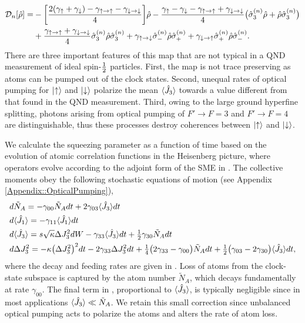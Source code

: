 \documentclass[aps,pra,twocolumn]{revtex4-1} %
\newcommand{\half}{\smallfrac{1}{2}}
\newcommand{\varz}{\Delta J_3^2}
\newcommand{\jz}{\hat{J}_3}
\newcommand{\NA}{\tilde{N}_A}
\newcommand{\gammauu}{\gamma_{\uparrow \rightarrow \uparrow}}
\newcommand{\gammadd}{\gamma_{\downarrow \rightarrow \downarrow}}
\newcommand{\gammaud}{\gamma_{\uparrow \rightarrow \downarrow}}
\newcommand{\gammadu}{\gamma_{\downarrow \rightarrow \uparrow}}
\newcommand{\gammau}{\gamma_{\uparrow}}
\newcommand{\gammad}{\gamma_{\downarrow}}
\begin{document}
	\begin{align} \label{Eq::OpticalPumpingMapSchr}
		\mathcal{D}_n [\hat{\rho}] 
				=& - \bigg[ \frac{2(\gammau+ \gammad) - \gammauu - \gammadd}{4} \bigg] \hat{\rho} - \frac{ \gammau - \gammad - \gammauu + \gammadd }{4} \big( \hat{\sigma}_3^{(n)} \hat{\rho}+ \hat{\rho} \hat{\sigma}_3^{(n)} \big) \nn \\
		&+ \frac{\gammauu+\gammadd}{4} \hat{\sigma}_ 3^{(n)}\hat{\rho} \hat{\sigma}_3^{(n)} + \gammaud  \hat{\sigma}_-^{(n)} \hat{\rho} \hat{\sigma}_+^{(n)} + \gammadu  \hat{\sigma}_+^{(n)} \hat{\rho} \hat{\sigma}_- ^{(n)}.   
	\end{align} 
There are three important features of this map that are not typical in a QND measurement of ideal spin-$\half$ particles.  
First, the map is not trace preserving as atoms can be pumped out of the clock states. 
Second, unequal rates of optical pumping for $\lvert{\uparrow}\rangle$ and $\lvert{\downarrow}\rangle$ polarize the mean $\expt{\jz}$ towards a value different from that found in the QND measurement. 
Third, owing to the large ground hyperfine splitting, photons arising from optical pumping of $F' \rightarrow F=3$ and $F' \rightarrow F=4$ are distinguishable, thus these processes destroy coherences between $\lvert{\uparrow}\rangle$ and $\lvert{\downarrow}\rangle$. 

We calculate the squeezing parameter as a function of time based on the evolution of atomic correlation functions  in the Heisenberg picture, where operators evolve according to the adjoint form of the SME in .  The collective moments obey the following stochastic equations of motion (see Appendix \ref{Appendix::OpticalPumping}),
	\begin{align} 
		&d \NA = -\gamma_{00} \NA  dt + 2\gamma_{03} \expt{\hat{J}_3} dt \label{Eq::NA}\\
		&d \expt{\hat{J}_1}  = -\gamma_{11} \expt{\hat{J}_1} dt  \label{Eq::MeanSpinDecay} \\
		&d \expt{\hat{J}_3}  = s\sqrt{\kappa} \varz dW -\gamma_{33} \expt{\hat{J}_3}dt + \smallfrac{1}{2}\gamma_{30} \NA dt   \\
		&d \varz  = - \kappa \big(\varz\big)^2 dt- 2 \gamma_{33} \varz dt + \smallfrac{1}{4} \big( 2\gamma_{33}-\gamma_{00} \big) \NA dt + \smallfrac{1}{2} \big( \gamma_{03} - 2 \gamma_{30} \big) \expt{\hat{J}_3} dt,   \label{Eq::varJz} 
	\end{align}
where the decay and feeding rates are given in .
Loss of atoms from the clock-state subspace is captured by the atom number $ \NA $, which decays fundamentally at rate $\gamma_{00}$. 
The final term in , proportional to $\langle{\hat{J}_3}\rangle$, is typically negligible since in most applications $\expt{\hat{J}_3} \ll \NA$.  
We retain this small correction since unbalanced optical pumping acts to polarize the atoms and alters the rate of atom loss.  
\end{document}
